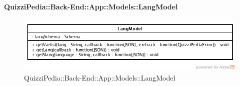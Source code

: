 \paragraph{QuizziPedia::Back-End::App::Models::LangModel}
\label{QuizziPedia::Back-End::App::Models::LangModel}
\begin{figure}[ht]
	\centering
	\includegraphics[scale=0.8]{UML/Classi/Back-End/QuizziPedia_Back-End_App_Models_langModel.png}
	\caption{QuizziPedia::Back-End::App::Models::LangModel}
\end{figure}
\FloatBarrier
